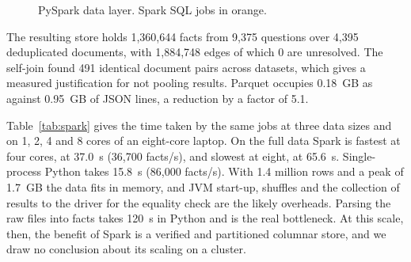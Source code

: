 \documentclass[11pt]{article}
\begin{document}
\begin{figure}[t]
\centering
{}
\caption{PySpark data layer. Spark SQL jobs in orange.}
\label{fig:spark}
\end{figure}

The resulting store holds 1,360,644 facts from 9,375 questions over 4,395 deduplicated
documents, with 1,884,748 edges of which 0 are unresolved. The self-join found 491
identical document pairs across datasets, which gives a measured justification for not
pooling results. Parquet occupies 0.18~GB as against 0.95~GB of JSON lines, a reduction
by a factor of 5.1.

Table~\ref{tab:spark} gives the time taken by the same jobs at three data sizes and on 1,
2, 4 and 8 cores of an eight-core laptop. On the full data Spark is fastest at four
cores, at 37.0~s (36,700 facts/s), and slowest at eight, at 65.6~s. Single-process Python takes 15.8~s (86,000 facts/s). With 1.4 million rows and a peak of 1.7~GB the data fits in
memory, and JVM start-up, shuffles and the collection of results to the driver for the
equality check are the likely overheads. Parsing the raw files into facts takes 120~s in
Python and is the real bottleneck. At this scale, then, the benefit of Spark is a
verified and partitioned columnar store, and we draw no conclusion about its scaling on
a cluster.
\end{document}
